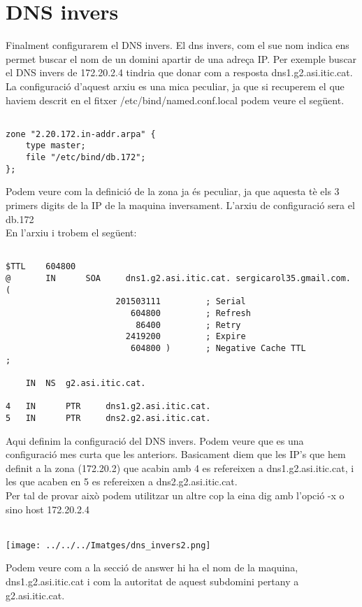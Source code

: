 \documentclass[11p]{article}
\begin{document}
\section{DNS invers}

Finalment configurarem el DNS invers. El dns invers, com el sue nom indica ens permet buscar el nom de un domini apartir de una adreça IP. Per exemple buscar el DNS invers de 172.20.2.4 tindria que donar com a resposta dns1.g2.asi.itic.cat. La configuració d'aquest arxiu es una mica peculiar, ja que si recuperem el que haviem descrit en el fitxer /etc/bind/named.conf.local podem veure el següent.

\begin{lstlisting}
	
zone "2.20.172.in-addr.arpa" {
	type master;
	file "/etc/bind/db.172";
};

\end{lstlisting}

Podem veure com la definició de la zona ja és peculiar, ja que aquesta tè els 3 primers digits de la IP de la maquina inversament. L'arxiu de configuració sera el db.172\\
En l'arxiu i trobem el següent: 
\newpage 
\begin{lstlisting}
	
$TTL    604800
@       IN      SOA     dns1.g2.asi.itic.cat. sergicarol35.gmail.com. (
                      201503111         ; Serial
                         604800         ; Refresh
                          86400         ; Retry
                        2419200         ; Expire
                         604800 )       ; Negative Cache TTL
;

	IN	NS 	g2.asi.itic.cat.

4 	IN      PTR     dns1.g2.asi.itic.cat.
5	IN	    PTR		dns2.g2.asi.itic.cat.

\end{lstlisting}

Aqui definim la configuració del DNS invers. Podem veure que es una configuració mes curta que les anteriors. Basicament diem que les IP's que hem definit a la zona (172.20.2) que acabin amb 4 es refereixen a dns1.g2.asi.itic.cat, i les que acaben en 5 es refereixen a dns2.g2.asi.itic.cat.\\
Per tal de provar això podem utilitzar un altre cop la eina dig amb l'opció -x o sino host 172.20.2.4 \\\\

\centerline{\texttt{[image: ../../../Imatges/dns\_invers2.png]} }
Podem veure com a la secció de answer hi ha el nom de la maquina, dns1.g2.asi.itic.cat i com la autoritat de aquest subdomini pertany a g2.asi.itic.cat.
\newpage 
\end{document}
